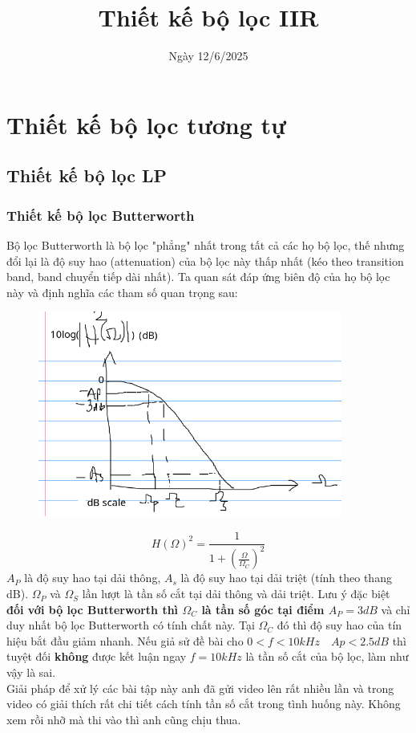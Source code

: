 \documentclass{article}
\title{Thiết kế bộ lọc IIR
}
\author{}
\date{Ngày 12/6/2025}
\begin{document}
\maketitle
\section{Thiết kế bộ lọc tương tự}
\subsection{Thiết kế bộ lọc LP}
\subsubsection{Thiết kế bộ lọc Butterworth}
Bộ lọc Butterworth là bộ lọc "phẳng" nhất trong tất cả các họ bộ lọc, thế nhưng đổi lại là độ suy hao
(attenuation) của bộ lọc này thấp nhất (kéo theo transition band, band chuyển tiếp dài nhất). Ta quan sát đáp ứng biên độ của họ bộ lọc này và định nghĩa các tham số quan trọng sau:
\begin{figure}[H]
  \begin{center}
  \includegraphics[width=10cm]{butter.png}
  \end{center}
  \end{figure}
  $$H(\Omega)^{2}=\frac{1}{1+(\frac{\Omega}{\Omega_{C}})^{2}}$$
$A_{P}$ là độ suy hao tại dải thông, $A_{s}$ là độ suy hao tại dải triệt (tính theo thang dB). $\Omega_{P}$ và
$\Omega_{S}$ lần lượt là tần số cắt tại dải thông và dải triệt. Lưu ý đặc biệt \textbf{đối với bộ lọc Butterworth thì $\Omega_{C}$ là
tần số góc tại điểm $A_{P}=3dB$} và chỉ duy nhất bộ lọc Butterworth có tính chất này. Tại $\Omega_{C}$ đó thì
độ suy hao của tín hiệu bắt đầu giảm nhanh. Nếu giả sử đề bài cho $0<f<10kHz \quad Ap<2.5dB$ thì tuyệt đối \textbf{không} được
kết luận ngay $f=10kHz$ là tần số cắt của bộ lọc, làm như vậy là sai.
\\ Giải pháp để xử lý các bài tập này anh đã gửi video lên rất nhiều lần và trong video có giải thích rất chi tiết
cách tính tần số cắt trong tình huống này. Không xem rồi nhỡ mà thi vào thì anh cũng chịu thua.
\end{document}
